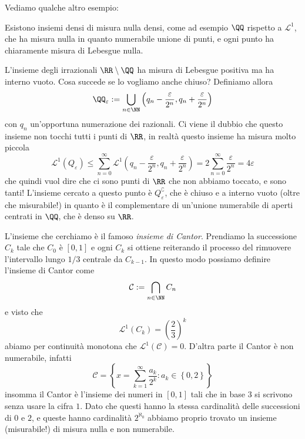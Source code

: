 \documentclass[11pt]{scrartcl}
\begin{document}
	Vediamo qualche altro esempio:
	\begin{example}
		Esistono insiemi densi di misura nulla densi, come ad esempio $\QQ$ rispetto a $\mathscr{L}^1$, che ha misura nulla in quanto numerabile unione di punti, e ogni punto ha chiaramente misura di Lebesgue nulla.
	\end{example}
	\begin{example}
		L'insieme degli irrazionali $\RR\setminus\QQ$ ha misura di Lebesgue positiva ma ha interno vuoto. Cosa succede se lo vogliamo anche chiuso? Definiamo allora 
		$$\QQ_\varepsilon:=\bigcup_{n\in\NN}\left(q_n-\frac{\varepsilon}{2^n},q_n+\frac{\varepsilon}{2^n}\right)$$
		con $q_n$ un'opportuna numerazione dei razionali. Ci viene il dubbio che questo insieme non tocchi tutti i punti di $\RR$, in realtà questo insieme ha misura molto piccola
		$$\mathscr{L}^1(Q_\varepsilon)\le \sum_{n=0}^{\infty}\mathscr{L}^1\left(q_n-\frac{\varepsilon}{2^n},q_n+\frac{\varepsilon}{2^n}\right)=2\sum_{n=0}^{\infty}\frac{\varepsilon}{2^n}=4\varepsilon$$
		che quindi vuol dire che ci sono punti di $\RR$ che non abbiamo toccato, e sono tanti! L'insieme cercato a questo punto è $Q_\varepsilon^\complement$, che è chiuso e a interno vuoto (oltre che misurabile!) in quanto è il complementare di un'unione numerabile di aperti centrati in $\QQ$, che è denso su $\RR$.
	\end{example}
	\begin{example}
		L'insieme che cerchiamo è il famoso \textit{insieme di Cantor}. Prendiamo la successione $C_k$ tale che $C_0$ è $[0,1]$ e ogni $C_k$ si ottiene reiterando il processo del rimuovere l'intervallo lungo $1/3$ centrale da $C_{k-1}$. In questo modo possiamo definire l'insieme di Cantor come
		$$\mathcal{C}:=\bigcap_{n\in\NN}C_n$$
		e visto che 
		$$\mathscr{L}^1(C_k)=\left(\frac{2}{3}\right)^k$$
		abiamo per continuità monotona che $\mathscr{L}^1(\mathcal{C})=0$. D'altra parte il Cantor è non numerabile, infatti
		$$\mathcal{C}=\left\{x=\sum_{k=1}^{\infty}\frac{a_k}{2^k}:a_k\in \left\{0,2\right\}\right\}$$
		insomma il Cantor è l'insieme dei numeri in $[0,1]$ tali che in base $3$ si scrivono senza usare la cifra $1$. Dato che questi hanno la stessa cardinalità delle successioni di $0$ e $2$, e queste hanno cardinalità $2^{\aleph_0}$ abbiamo proprio trovato un insieme (misurabile!) di misura nulla e non numerabile.
	\end{example}
\end{document}
